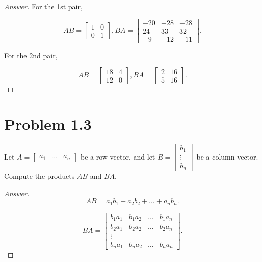 \documentclass{amsbook}
\theoremstyle{definition}
\theoremstyle{remark}
\numberwithin{section}{chapter}
\numberwithin{equation}{chapter}
\begin{document}
\begin{proof}[Answer]

For the 1st pair,

\[AB=\begin{bmatrix}
1&0\\
0&1\end{bmatrix}, BA=\begin{bmatrix}
   -20  & -28  & -28\\
    24 &   33  &  32\\
    -9  & -12  & -11\end{bmatrix}.\]
    
For the 2nd pair,

\[AB=\begin{bmatrix}
    18   &  4\\
    12    &  0 \end{bmatrix}, BA=\begin{bmatrix}
     2   & 16 \\
     5   & 16 \end{bmatrix}. \]

\end{proof}

\section{Problem 1.3}

Let $A=\begin{bmatrix}
a_1 & \dots & a_n
\end{bmatrix}$ be a row vector, and let $B=\begin{bmatrix}
b_1\\
\vdots\\
b_n
\end{bmatrix}$ be a column vector. Compute the products $AB$ and $BA$.

\begin{proof}[Answer]

\[AB=a_1b_1+a_2b_2+\dots+a_nb_n.\]

\[BA=\begin{bmatrix}
b_1a_1 & b_1a_2 & \dots & b_1a_n \\
b_2a_1 & b_2a_2 & \dots & b_2a_n \\
\vdots \\
b_na_1 & b_na_2 & \dots & b_na_n
\end{bmatrix}. \]

\end{proof}
\end{document}
